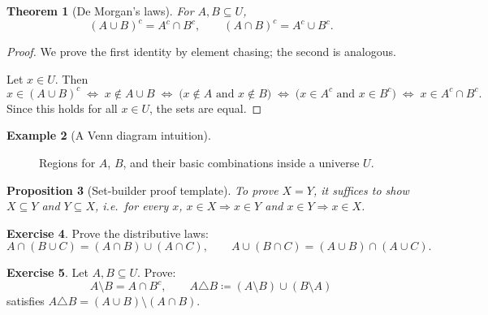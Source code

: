 \documentclass[12pt]{article}
\numberwithin{equation}{section}
\theoremstyle{plain}
\newtheorem{theorem}{Theorem}[section]
\newtheorem{proposition}[theorem]{Proposition}
\theoremstyle{definition}
\newtheorem{example}[theorem]{Example}
\newtheorem{exercise}[theorem]{Exercise}
\theoremstyle{remark}
\begin{document}
\begin{theorem}[De Morgan's laws]\label{thm:demorgan}
For $A,B\subseteq U$,
\[
(A\cup B)^c = A^c\cap B^c,
\qquad
(A\cap B)^c = A^c\cup B^c.
\]
\end{theorem}

\begin{proof}
We prove the first identity by element chasing; the second is analogous.

Let $x\in U$. Then
\[
x\in (A\cup B)^c
\;\Longleftrightarrow\;
x\notin A\cup B
\;\Longleftrightarrow\;
\bigl(x\notin A \text{ and } x\notin B\bigr)
\;\Longleftrightarrow\;
\bigl(x\in A^c \text{ and } x\in B^c\bigr)
\;\Longleftrightarrow\;
x\in A^c\cap B^c.
\]
Since this holds for all $x\in U$, the sets are equal.
\end{proof}

\begin{example}[A Venn diagram intuition]
\begin{figure}[H]
\centering
{}
\caption{Regions for $A$, $B$, and their basic combinations inside a universe $U$.}
\end{figure}
\end{example}

\begin{proposition}[Set-builder proof template]\label{prop:setbuilder}
To prove $X=Y$, it suffices to show $X\subseteq Y$ and $Y\subseteq X$, i.e.\ for every $x$,  
$x\in X \Rightarrow x\in Y$ and $x\in Y \Rightarrow x\in X$.
\end{proposition}

\begin{exercise}
Prove the distributive laws:
\[
A\cap (B\cup C) = (A\cap B)\cup (A\cap C),
\qquad
A\cup (B\cap C) = (A\cup B)\cap (A\cup C).
\]
\end{exercise}

\begin{exercise}
Let $A,B\subseteq U$. Prove:
\[
A\setminus B = A\cap B^c,
\qquad
A\triangle B \coloneqq (A\setminus B)\cup (B\setminus A)
\]
satisfies $A\triangle B = (A\cup B)\setminus(A\cap B)$.
\end{exercise}
\end{document}
